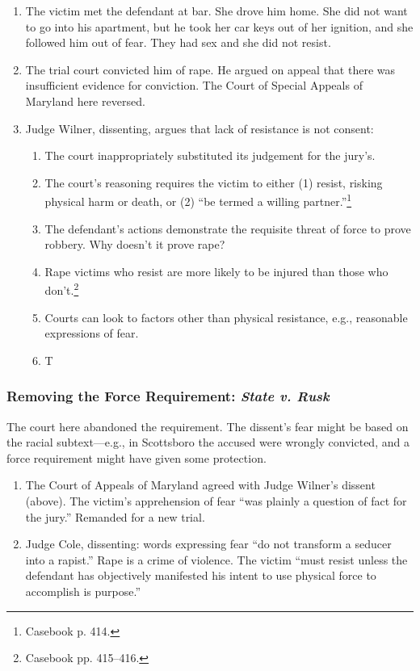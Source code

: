 \begin{enumerate}
    \item The victim met the defendant at bar. She drove him home. She did not 
    want to go into his apartment, but he took her car keys out of her 
    ignition, and she followed him out of fear. They had sex and she did not 
    resist.
    \item The trial court convicted him of rape. He argued on appeal that 
    there was insufficient evidence for conviction. The Court of Special 
    Appeals of Maryland here reversed.
    \item Judge Wilner, dissenting, argues that lack of resistance is not 
    consent:
    \begin{enumerate}
        \item The court inappropriately substituted its judgement for the 
        jury's.
        \item The court's reasoning requires the victim to either (1) resist, 
        risking physical harm or death, or (2) ``be termed a willing 
        partner.''\footnote{Casebook p. 414.}
        \item The defendant's actions demonstrate the requisite threat of 
        force to prove robbery. Why doesn't it prove rape?
        \item Rape victims who resist are more likely to be injured than those 
        who don't.\footnote{Casebook pp. 415--416.}
        \item Courts can look to factors other than physical resistance, e.g., 
        reasonable expressions of fear.
        \item T
    \end{enumerate}
\end{enumerate}

\subsubsection{Removing the Force Requirement: \emph{State v. Rusk}}

The court here abandoned the requirement. The dissent's fear might be based on 
the racial subtext---e.g., in Scottsboro the accused were wrongly convicted, 
and a force requirement might have given some protection.

\begin{enumerate}
    \item The Court of Appeals of Maryland agreed with Judge Wilner's dissent 
    (above). The victim's apprehension of fear ``was plainly a question of 
    fact for the jury.'' Remanded for a new trial.
    \item Judge Cole, dissenting: words expressing fear ``do not transform a 
    seducer into a rapist.'' Rape is a crime of violence. The victim ``must 
    resist unless the defendant has objectively manifested his intent to use 
    physical force to accomplish is purpose.''
\end{enumerate}


